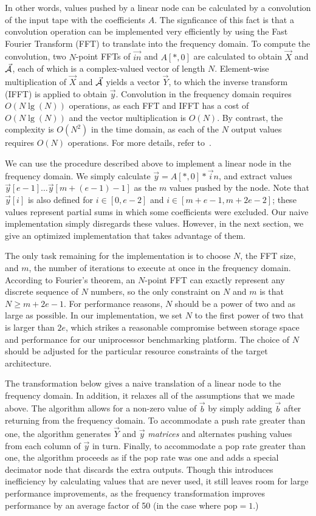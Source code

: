 In other words, values pushed by a linear node can be calculated by a
convolution of the input tape with the coefficients $A$.  The
signficance of this fact is that a convolution operation can be
implemented very efficiently by using the Fast Fourier Transform (FFT)
to translate into the frequency domain.  To compute the convolution,
two $N$-point FFTs of $\vec{in}$ and $A[*,0]$ are calculated to obtain
$\vec{X}$ and $\vec{\cal A}$, each of which is a complex-valued vector
of length $N$.  Element-wise multiplication of $\vec X$ and
$\vec{\cal A}$ yields a vector $\vec{Y}$, to which the inverse
transform (IFFT) is applied to obtain $\vec{y}$.  Convolution in the
frequency domain requires $O(N \lg(N))$ operations, as each FFT and
IFFT has a cost of $O(N \lg (N))$ and the vector multiplication is
$O(N)$.  By contrast, the complexity is $O(N^2)$ in the time domain,
as each of the $N$ output values requires $O(N)$ operations.  For more
details, refer to~\cite{oppenheim-discrete}.

We can use the procedure described above to implement a linear node in
the frequency domain.  We simply calculate ${\vec y} = A[*,0] * {\vec
in}$, and extract values ${\vec y}[e-1] \dots {\vec y}[m+(e-1)-1]$ as
the $m$ values pushed by the node.  Note that ${\vec y}[i]$ is also
defined for $i \in [0, e-2]$ and $i \in [m+e-1,m+2e-2]$; these values
represent partial sums in which some coefficients were excluded.  Our
naive implementation simply disregards these values.  However, in the
next section, we give an optimized implementation that takes advantage
of them.

The only task remaining for the implementation is to choose $N$, the
FFT size, and $m$, the number of iterations to execute at once in the
frequency domain.  According to Fourier's theorem, an $N$-point FFT
can exactly represent any discrete sequence of $N$ numbers, so the
only constraint on $N$ and $m$ is that $N \ge m+2e-1$.  For
performance reasons, $N$ should be a power of two and as large as
possible.  In our implementation, we set $N$ to the first power of two
that is larger than $2e$, which strikes a reasonable compromise
between storage space and performance for our uniprocessor
benchmarking platform.  The choice of $N$ should be adjusted for the
particular resource constraints of the target architecture.

The transformation below gives a naive translation of a linear node to
the frequency domain.  In addition, it relaxes all of the assumptions
that we made above.  The algorithm allows for a non-zero value of
${\vec b}$ by simply adding $\vec{b}$ after returning from the
frequency domain.  To accommodate a push rate greater than one, the
algorithm generates $\vec{Y}$ and $\vec{y}$ {\it matrices} and
alternates pushing values from each column of $\vec{y}$ in turn.
Finally, to accommodate a pop rate greater than one, the algorithm
proceeds as if the pop rate was one and adds a special decimator node
that discards the extra outputs.  Though this introduces inefficiency
by calculating values that are never used, it still leaves room for
large performance improvements, as the frequency transformation
improves performance by an average factor of 50 (in the case where
$\mbox{pop}=1$.)


